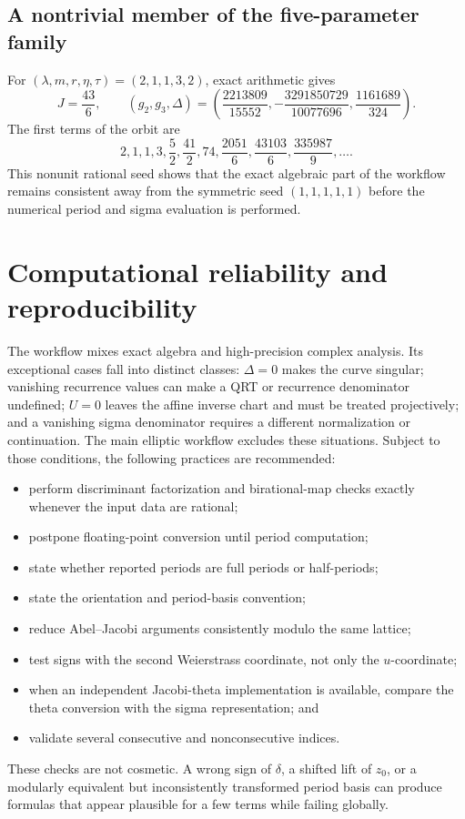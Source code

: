 \documentclass[11pt]{article}
\newcommand{\taupar}{\tau}
\begin{document}
\subsection{A nontrivial member of the five-parameter family}
For $(\lambda,m,r,\eta,\taupar)=(2,1,1,3,2)$, exact arithmetic gives
\[
  J=\frac{43}{6},
  \qquad
  (g_2,g_3,\Delta)=
  \left(\frac{2213809}{15552},
  -\frac{3291850729}{10077696},
  \frac{1161689}{324}\right).
\]
The first terms of the orbit are
\[
  2,1,1,3,\frac{5}{2},\frac{41}{2},74,\frac{2051}{6},
  \frac{43103}{6},\frac{335987}{9},\ldots.
\]
This nonunit rational seed shows that the exact algebraic part of the workflow
remains consistent away from the symmetric seed $(1,1,1,1,1)$ before the
numerical period and sigma evaluation is performed.

\section{Computational reliability and reproducibility}
The workflow mixes exact algebra and high-precision complex analysis. Its
exceptional cases fall into distinct classes: $\Delta=0$ makes the curve
singular; vanishing recurrence values can make a QRT or recurrence denominator
undefined; $U=0$ leaves the affine inverse chart and must be treated
projectively; and a vanishing sigma denominator requires a different
normalization or continuation. The main elliptic workflow excludes these
situations. Subject to those conditions, the following practices are
recommended:
\begin{itemize}[leftmargin=2em]
  \item perform discriminant factorization and birational-map checks exactly
        whenever the input data are rational;
  \item postpone floating-point conversion until period computation;
  \item state whether reported periods are full periods or half-periods;
  \item state the orientation and period-basis convention;
  \item reduce Abel--Jacobi arguments consistently modulo the same lattice;
  \item test signs with the second Weierstrass coordinate, not only the
        $u$-coordinate;
  \item when an independent Jacobi-theta implementation is available, compare
        the theta conversion with the sigma representation; and
  \item validate several consecutive and nonconsecutive indices.
\end{itemize}
These checks are not cosmetic. A wrong sign of $\delta$, a shifted lift of
$z_0$, or a modularly equivalent but inconsistently transformed period basis
can produce formulas that appear plausible for a few terms while failing
globally.
\end{document}
